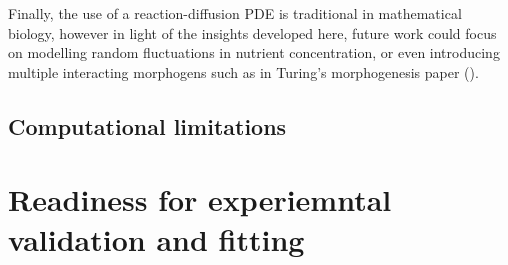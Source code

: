 Finally, the use of a reaction-diffusion PDE is traditional in mathematical biology, however
in light of the insights developed here, future work could focus on modelling 
random fluctuations in nutrient concentration, or even introducing multiple interacting 
morphogens such as in Turing's morphogenesis paper (\cite{turing1990chemical}).



\subsection{Computational limitations}


\section{Readiness for experiemntal validation and fitting}\label{expFitting}










